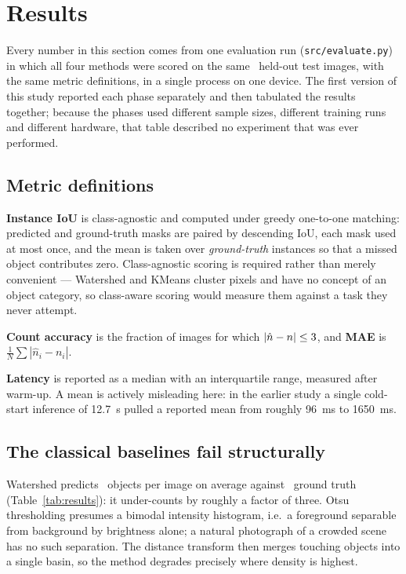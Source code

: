 \documentclass[12pt, a4paper]{article}
\begin{document}
\section{Results}
\label{sec:results}

Every number in this section comes from one evaluation run
(\texttt{src/evaluate.py}) in which all four methods were scored on the same
\nTest\ held-out test images, with the same metric definitions, in a single
process on one device.  The first version of this study reported each phase
separately and then tabulated the results together; because the phases used
different sample sizes, different training runs and different hardware, that
table described no experiment that was ever performed.

\resultsTable

\subsection{Metric definitions}

\textbf{Instance IoU} is class-agnostic and computed under greedy one-to-one
matching: predicted and ground-truth masks are paired by descending IoU, each
mask used at most once, and the mean is taken over \emph{ground-truth}
instances so that a missed object contributes zero.  Class-agnostic scoring is
required rather than merely convenient --- Watershed and KMeans cluster pixels
and have no concept of an object category, so class-aware scoring would
measure them against a task they never attempt.

\textbf{Count accuracy} is the fraction of images for which
$|\hat{n} - n| \le 3$, and \textbf{MAE} is
$\frac{1}{N}\sum |\hat{n}_i - n_i|$.

\textbf{Latency} is reported as a median with an interquartile range, measured
after warm-up.  A mean is actively misleading here: in the earlier study a
single cold-start inference of 12.7~s pulled a reported mean from roughly
96~ms to 1650~ms.

\subsection{The classical baselines fail structurally}

Watershed predicts \WsPred\ objects per image on average against \gtCount\
ground truth (Table~\ref{tab:results}): it under-counts by roughly a factor of
three.  Otsu thresholding presumes a bimodal intensity histogram, i.e.\ a
foreground separable from background by brightness alone; a natural photograph
of a crowded scene has no such separation.  The distance transform then merges
touching objects into a single basin, so the method degrades precisely where
density is highest.
\end{document}
